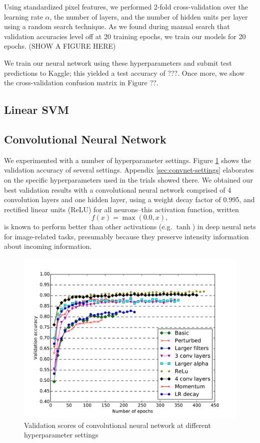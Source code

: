 \documentclass{acm_proc_article-sp}
\begin{document}
Using standardized pixel features, we performed 2-fold cross-validation over the learning rate $\alpha$, the number of layers, and the number of hidden units per layer using a random search technique. As we found during manual search that validation accuracies level off at 20 training epochs, we train our models for 20 epochs. (SHOW A FIGURE HERE)

We train our neural network using these hyperparameters and submit test predictions to Kaggle; this yielded a test accuracy of ???. Once more, we show the cross-validation confusion matrix in Figure ??.

\subsection{Linear SVM}


\subsection{Convolutional Neural Network}
We experimented with a number of hyperparameter settings. Figure \ref{fig:convnet-compare} shows the validation accuracy of several settings. Appendix \ref{sec:convnet-settings} elaborates on the specific hyperparameters used in the trials showed there. We obtained our best validation results with a convolutional neural network comprised of 4 convolution layers and one hidden layer, using a weight decay factor of 0.995, and rectified linear units (ReLU)  for all neurons--this activation function, written $$f(x) = \max(0.0, x),$$ is known to perform better than other activations (e.g. $\tanh$) in deep neural nets for image-related tasks, presumably because they preserve intensity information about incoming information.\cite{Nair}

\begin{figure}[h!]
	\centering
	\includegraphics[width=\linewidth]{convnet_comparison}
  	\caption{Validation scores of convolutional neural network at different hyperparameter settings}
  	\label{fig:convnet-compare}
\end{figure}
\end{document}

